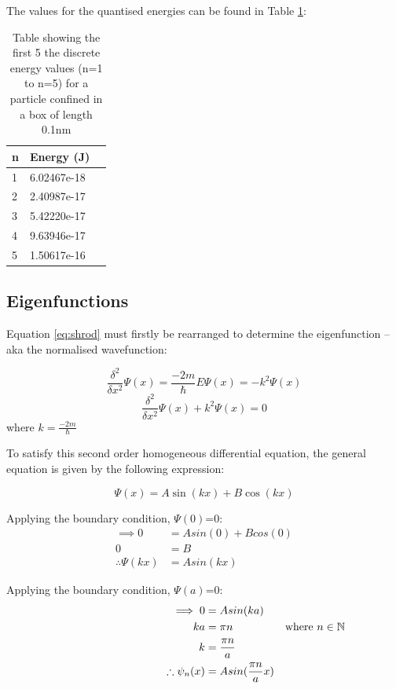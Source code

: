 The values for the quantised energies can be found in Table \ref{tab:qEnerergy}:

\begin{table}[h!]
\centering
\begin{tabular}{|l|l|l|}
\hline
\textbf{n} & \textbf{Energy (J)} \\ \hline
1 & 6.02467e-18 \\ \hline
2 & 2.40987e-17 \\ \hline
3 & 5.42220e-17 \\ \hline
4 & 9.63946e-17 \\ \hline
5 & 1.50617e-16 \\ \hline
\end{tabular}
\caption{Table showing the first 5 the discrete energy values (n=1 to n=5) for a particle confined in a box of length 0.1nm}
\label{tab:qEnerergy}
\end{table}

\subsection{Eigenfunctions}\label{sec:eigenFunction}
Equation \ref{eq:shrod} must firstly be rearranged to determine the eigenfunction -- aka the normalised wavefunction:

$$\frac{\delta^{2}}{\delta x^{2}}\Psi (x) = \frac{-2m}{\hbar} E \Psi (x) = -k^2 \Psi (x)$$
$$\frac{\delta^{2}}{\delta x^{2}}\Psi (x) + k^2 \Psi (x) = 0$$
where $k=\frac{-2m}{\hbar}$

To satisfy this second order homogeneous differential equation, the general equation is given by the following expression:

$$\Psi (x) = A \sin(kx) + B \cos(kx)$$

Applying the boundary condition, $\Psi (0)$=0:
\begin{align*}
\implies 0 &= A sin(0) + B cos(0)\\
 0 &= B\\
\therefore \Psi (kx) &= A sin(kx)
\end{align*}

Applying the boundary condition, $\Psi (a)$=0:
\begin{align*}
\hspace{3.5cm} \implies 0 &= A sin(ka)\\
ka &= \pi n & \text{where } n \in \mathbb{N}\\
k &= \frac{\pi n}{a}\\
\therefore \psi_n (x) &= A sin(\frac{\pi n}{a}x)
\end{align*}

